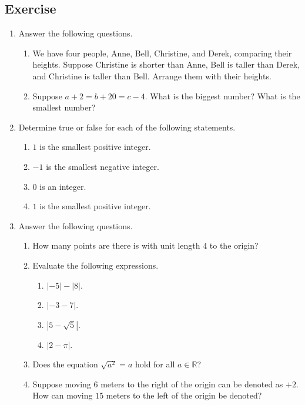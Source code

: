 \documentclass[11pt]{book}
\theoremstyle{break}
\theoremstyle{no_label}
\newcommand{\bbR}{\mathbb{R}}
\numberwithin{equation}{section}
\begin{document}
\subsection*{Exercise}
\begin{enumerate}[label=\arabic*.]
    \item Answer the following questions.
    \begin{enumerate}
        \item We have four people, Anne, Bell, Christine, and Derek, comparing their heights. Suppose Christine is shorter than Anne, Bell is taller than Derek, and Christine is taller than Bell. Arrange them with their heights.
        \item Suppose $a+2=b+20=c-4$. What is the biggest number? What is the smallest number?
    \end{enumerate}
    \item Determine true or false for each of the following statements.
    \begin{enumerate}
        \item $1$ is the smallest positive integer.
        \item $-1$ is the smallest negative integer.
        \item $0$ is an integer.
        \item $1$ is the smallest positive integer.
    \end{enumerate}
    \item Answer the following questions.
    \begin{enumerate}
        \item How many points are there is with unit length $4$ to the origin?
        \item Evaluate the following expressions.
        \begin{multicols}{4}
            \begin{enumerate}[label=\alph*.]
                \item $|-5|-|8|$.
                \item $|-3-7|$.
                \item $|5-\sqrt{5}|$.
                \item $|2-\pi|$.
            \end{enumerate}
        \end{multicols}
        \item Does the equation $\sqrt{a^2}=a$ hold for all $a\in\bbR$?
        \item Suppose moving $6$ meters to the right of the origin can be denoted as $+2$. How can moving $15$ meters to the left of the origin be denoted?

\end{enumerate}
\end{enumerate}
\end{document}
